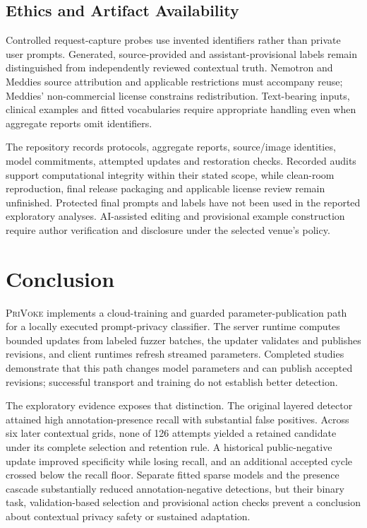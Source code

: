 \documentclass[conference]{IEEEtran}
\newcommand{\privoke}{\textsc{PriVoke}\xspace}
\begin{document}
\subsection{Ethics and Artifact Availability}

Controlled request-capture probes use invented identifiers rather than private user prompts. Generated, source-provided and assistant-provisional labels remain distinguished from independently reviewed contextual truth. Nemotron and Meddies source attribution and applicable restrictions must accompany reuse; Meddies' non-commercial license constrains redistribution. Text-bearing inputs, clinical examples and fitted vocabularies require appropriate handling even when aggregate reports omit identifiers.

The repository records protocols, aggregate reports, source/image identities, model commitments, attempted updates and restoration checks. Recorded audits support computational integrity within their stated scope, while clean-room reproduction, final release packaging and applicable license review remain unfinished. Protected final prompts and labels have not been used in the reported exploratory analyses. AI-assisted editing and provisional example construction require author verification and disclosure under the selected venue's policy.

\section{Conclusion}
\label{sec:conclusion}

\privoke implements a cloud-training and guarded parameter-publication path for a locally executed prompt-privacy classifier. The server runtime computes bounded updates from labeled fuzzer batches, the updater validates and publishes revisions, and client runtimes refresh streamed parameters. Completed studies demonstrate that this path changes model parameters and can publish accepted revisions; successful transport and training do not establish better detection.

The exploratory evidence exposes that distinction. The original layered detector attained high annotation-presence recall with substantial false positives. Across six later contextual grids, none of 126 attempts yielded a retained candidate under its complete selection and retention rule. A historical public-negative update improved specificity while losing recall, and an additional accepted cycle crossed below the recall floor. Separate fitted sparse models and the presence cascade substantially reduced annotation-negative detections, but their binary task, validation-based selection and provisional action checks prevent a conclusion about contextual privacy safety or sustained adaptation.
\end{document}
